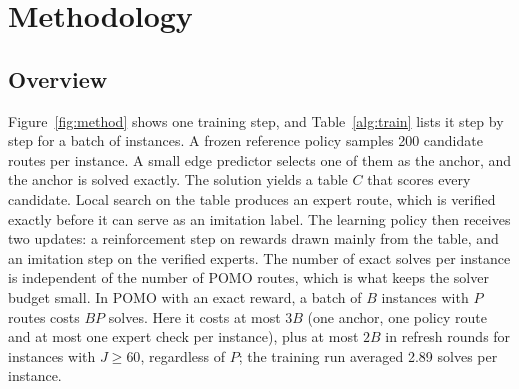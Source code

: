 \documentclass[preprint,12pt,authoryear]{elsarticle}
\begin{document}
\section{Methodology}
\label{sec:method}

\subsection{Overview}

Figure~\ref{fig:method} shows one training step, and Table~\ref{alg:train} lists it step by step for a batch of instances. A frozen reference policy samples 200 candidate routes per instance. A small edge predictor selects one of them as the anchor, and the anchor is solved exactly. The solution yields a table $C$ that scores every candidate. Local search on the table produces an expert route, which is verified exactly before it can serve as an imitation label. The learning policy then receives two updates: a reinforcement step on rewards drawn mainly from the table, and an imitation step on the verified experts. The number of exact solves per instance is independent of the number of POMO routes, which is what keeps the solver budget small. In POMO with an exact reward, a batch of $B$ instances with $P$ routes costs $BP$ solves. Here it costs at most $3B$ (one anchor, one policy route and at most one expert check per instance), plus at most $2B$ in refresh rounds for instances with $J \ge 60$, regardless of $P$; the training run averaged 2.89 solves per instance.


\end{document}
